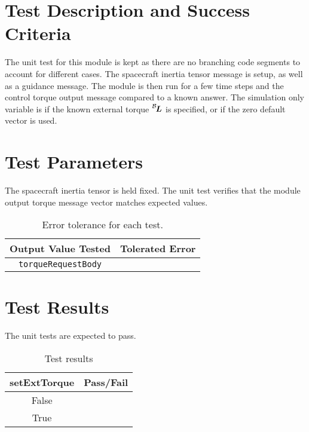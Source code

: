 
\section{Test Description and Success Criteria}
The unit test  for this module is kept as there are no branching code segments to account for different cases.  The spacecraft inertia tensor message is setup, as well as a guidance message.  The module is then run for a few time steps and the control torque output message compared to a known answer.  The simulation only variable is if the known external torque $\leftexp{B}{\bm L}$ is specified, or if the zero default vector is used.  



\section{Test Parameters}
The spacecraft inertia tensor is held fixed.
The unit test verifies that the module output torque message vector matches expected values.
\begin{table}[htbp]
	\caption{Error tolerance for each test.}
	\label{tab:errortol}
	\centering \fontsize{10}{10}\selectfont
	\begin{tabular}{ c | c } %
		\hline\hline
		\textbf{Output Value Tested}  & \textbf{Tolerated Error}  \\ 
		\hline
		{\tt torqueRequestBody}        & 	   \\ 
		\hline\hline
	\end{tabular}
\end{table}




\section{Test Results}
The unit tests are expected to pass.
\begin{table}[H]
	\caption{Test results}
	\label{tab:results}
	\centering \fontsize{10}{10}\selectfont
	\begin{tabular}{c | c  } %
		\hline\hline
		\textbf{setExtTorque} &\textbf{Pass/Fail} \\ 
		\hline
	   False   			&  \\ 
	   True   			&  \\ 
	   \hline\hline
	\end{tabular}
\end{table}
